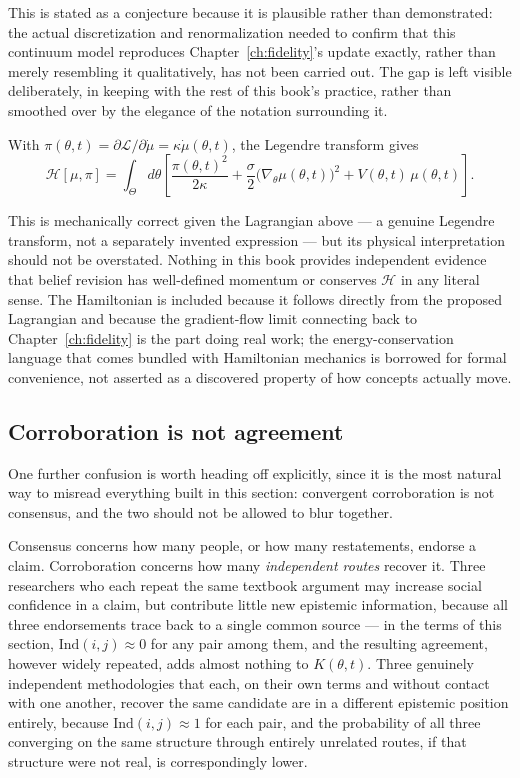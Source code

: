 \begin{optionalformal}
This is stated as a conjecture because it is plausible rather than demonstrated: the actual discretization and renormalization needed to confirm that this continuum model reproduces Chapter~\ref{ch:fidelity}'s update exactly, rather than merely resembling it qualitatively, has not been carried out. The gap is left visible deliberately, in keeping with the rest of this book's practice, rather than smoothed over by the elegance of the notation surrounding it.

\begin{definition}
With $\pi(\theta,t) = \partial\mathcal{L}/\partial\dot\mu = \kappa\dot\mu(\theta,t)$, the Legendre transform gives
\[
\mathcal{H}[\mu,\pi] = \int_\Theta d\theta \left[\frac{\pi(\theta,t)^2}{2\kappa} + \frac{\sigma}{2}\bigl(\nabla_\theta\mu(\theta,t)\bigr)^2 + V(\theta,t)\,\mu(\theta,t)\right].
\]
\end{definition}

This is mechanically correct given the Lagrangian above --- a genuine Legendre transform, not a separately invented expression --- but its physical interpretation should not be overstated. Nothing in this book provides independent evidence that belief revision has well-defined momentum or conserves $\mathcal{H}$ in any literal sense. The Hamiltonian is included because it follows directly from the proposed Lagrangian and because the gradient-flow limit connecting back to Chapter~\ref{ch:fidelity} is the part doing real work; the energy-conservation language that comes bundled with Hamiltonian mechanics is borrowed for formal convenience, not asserted as a discovered property of how concepts actually move.
\end{optionalformal}

\subsection{Corroboration is not agreement}

One further confusion is worth heading off explicitly, since it is the most natural way to misread everything built in this section: convergent corroboration is not consensus, and the two should not be allowed to blur together.

Consensus concerns how many people, or how many restatements, endorse a claim. Corroboration concerns how many \emph{independent routes} recover it. Three researchers who each repeat the same textbook argument may increase social confidence in a claim, but contribute little new epistemic information, because all three endorsements trace back to a single common source --- in the terms of this section, $\mathrm{Ind}(i,j) \approx 0$ for any pair among them, and the resulting agreement, however widely repeated, adds almost nothing to $K(\theta,t)$. Three genuinely independent methodologies that each, on their own terms and without contact with one another, recover the same candidate are in a different epistemic position entirely, because $\mathrm{Ind}(i,j) \approx 1$ for each pair, and the probability of all three converging on the same structure through entirely unrelated routes, if that structure were not real, is correspondingly lower.

